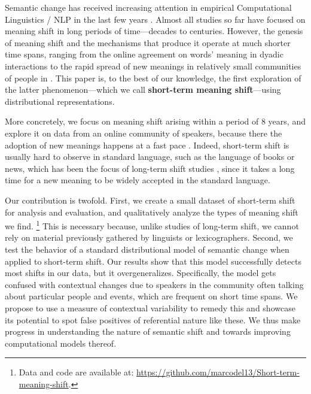 Semantic change has received increasing attention in empirical Computational Linguistics / NLP in the last few years \cite{tang2018state,KutuzovEtal-coling2018}. Almost all studies so far have focused on meaning shift in long periods of time---decades to centuries. However, the genesis of meaning shift and the mechanisms that produce it operate at much shorter time spans, ranging
from the online agreement on words' meaning in dyadic interactions \cite{brennan1996conceptual} to the rapid spread of new meanings in relatively small communities of people in \cite{wenger1998communities,eckert-mcconnellginet1992}.
This paper is, to the best of our knowledge, the first exploration of the latter phenomenon---which we call \textbf{short-term meaning shift}---using distributional representations.

More concretely, we focus on meaning shift arising within a period of 8 years, and explore it on data from an online community of speakers, because there the 
adoption of new meanings happens at a fast pace \cite{Clark96,hasan2009}.
Indeed, short-term shift is usually hard to observe in standard language, such
as the language of books or news, which has been the focus of
long-term shift studies \cite[e.g.,][]{hamilton2016diachronic,kulkarni2015statistically}, since
it takes a long time for a new meaning to be widely accepted in the standard language. 

Our contribution is twofold. First, we create a small dataset of short-term shift for analysis and evaluation, and qualitatively analyze the types of meaning shift we find.%
\footnote{\label{note1}Data and code are available at: 
\url{https://github.com/marcodel13/Short-term-meaning-shift}.} 
This is necessary because, unlike studies of long-term shift, we cannot rely on material previously gathered by linguists or lexicographers.
Second, we test the behavior of a standard distributional model of semantic change when
 applied to short-term shift. 
Our results show that this model successfully detects most shifts in our data, but it overgeneralizes. Specifically, the model gets confused with contextual changes due to speakers in the community often talking about particular people and events, which are frequent on short time spans. 
We propose to use a measure of contextual variability to remedy this and showcase its potential to spot false positives of referential nature like these.
We thus make progress in understanding the nature of semantic shift and towards improving computational models thereof.

